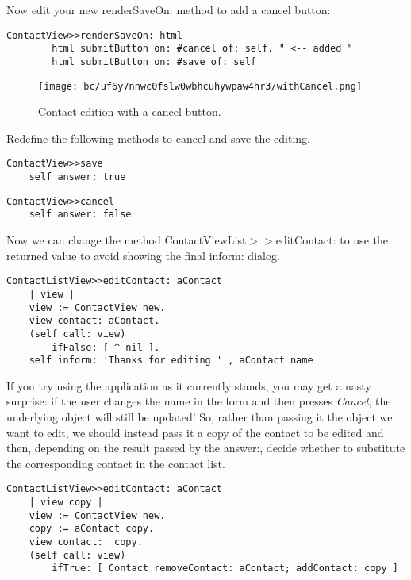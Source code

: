 \documentclass[a4paper,10pt,twoside]{book}
\newcommand{\ct}[1]{{\small\ttfamily\textup{#1}}}
\begin{document}
Now edit your new \ct{renderSaveOn:} method to add a cancel button:

\begin{lstlisting}
ContactView>>renderSaveOn: html
        html submitButton on: #cancel of: self. " <-- added "
        html submitButton on: #save of: self
\end{lstlisting}

\begin{figure}[h!tbp]
	\begin{center}
		\texttt{[image: bc/uf6y7nnwc0fslw0wbhcuhywpaw4hr3/withCancel.png]}
		\caption{Contact edition with a cancel button.\label{book:components:calling:answer:cancel}}
	\end{center}
\end{figure}


Redefine the following methods to cancel and save the editing.

\begin{lstlisting}
ContactView>>save
    self answer: true
\end{lstlisting}

\begin{lstlisting}
ContactView>>cancel
    self answer: false
\end{lstlisting}

Now we can change the method \ct{ContactViewList$>$$>$editContact:} to use the returned value to avoid showing the final \ct{inform:} dialog. 

\begin{lstlisting}
ContactListView>>editContact: aContact
    | view |
    view := ContactView new.
    view contact: aContact.
    (self call: view)
        ifFalse: [ ^ nil ].
    self inform: 'Thanks for editing ' , aContact name
\end{lstlisting}

If you try using the application as it currently stands, you may get a nasty surprise: if the user changes the name in the form and then presses \textit{Cancel}, the underlying object will still be updated! So, rather than passing it the object we want to edit, we should instead pass it a copy of the contact to be edited and then, depending on the result passed by the \ct{answer:}, decide whether to substitute the corresponding contact in the contact list.

\begin{lstlisting}
ContactListView>>editContact: aContact
    | view copy |
    view := ContactView new.
    copy := aContact copy.
    view contact:  copy.
    (self call: view) 
        ifTrue: [ Contact removeContact: aContact; addContact: copy ]
\end{lstlisting}
\end{document}

